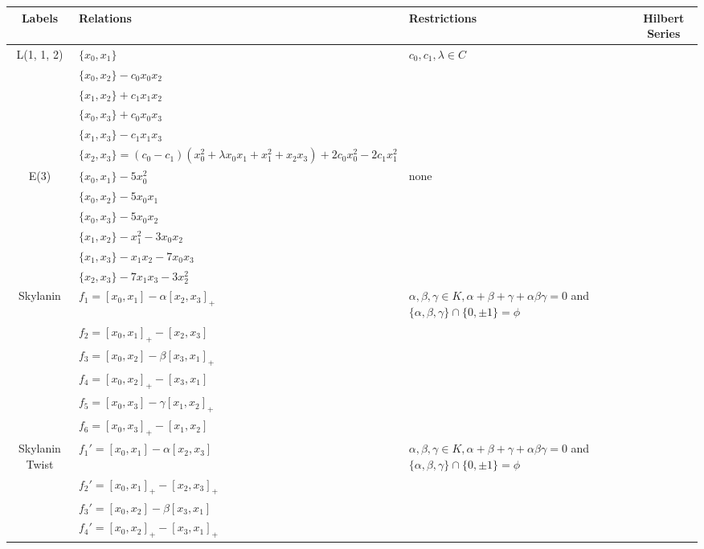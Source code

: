 \documentclass[12]{article}
\begin{document}
\begin{longtable}[c]{|c|p{5.75cm}|p{2.8cm}|c|}
\toprule
 Labels & Relations & Restrictions & Hilbert Series \\ 
\endfirsthead 
  \hline
L(1, 1, 2)& $ \{x_0, x_1\} $ &\multirow{6}{*}{$ c_0,c_1,\lambda \in C $} & \\ 
 & $ \{x_0, x_2\} - c_0x_0x_2 $ & &  \\ 
   & $ \{x_1, x_2\} + c_1x_1x_2 $ & & \\  
   & $ \{x_0, x_3\} +  c_0x_0x_3 $ & & \\  
   & $ \{x_1 , x_3\} - c_1x_1x_3 $ & & \\ 
   & $ \{x_2, x_3\} = (c_0 - c_1)( x^2_0 + \lambda x_0x_1 + x^2_1 + x_2x_3 ) + 2 c_0x^2_0 - 2 c_1x^2_1 $ & &  \\  
\hline
E(3) & $ \{x_0, x_1\} - 5x^2_0 $  &\multirow{6}{*}{none} & \\ 
 &  $ \{x_0, x_2\} - 5x_0x_1 $ & &  \\ 
   & $ \{x_0, x_3\} -5 x_0x_2 $ & & \\  
   & $ \{x_1, x_2\} -  x^2_1 - 3 x_0x_2 $ & & \\  
   & $ \{x_1 , x_3\} - x_1x_2 - 7x_0x_3 $ & & \\ 
   & $ \{x_2 ,   x_3\} - 7x_1x_3 - 3x^2_2  $ & &  \\  
\hline
 Skylanin& $ f_1 = [ x_0, x_1]  -  \alpha[x_2, x_3]_+$ &$ \alpha, \beta, \gamma \in K,\alpha + \beta + \gamma +\alpha \beta \gamma = 0 $ and $ \{ \alpha, \beta, \gamma \} \cap \{0, \pm1\} = \phi $& \\ 
& $ f_2  = [x_0, x_1]_+  -  [x_2, x_3] $ & &  \\ 
   & $ f_3  = [x_0, x_2] - \beta [x_3, x_1]_+ $ & & \\  
   &  $ f_4 = [x_0, x_2]_+ - [x_3, x_1] $ & & \\  
   & $ f_5 = [x_0, x_3] - \gamma [x_1, x_2]_+ $ & & \\ 
   & $ f_6 = [x_0, x_3]_+ - [x_1, x_2] $ & &  \\  
\hline
Skylanin Twist & $ f_1' = [x_0, x_1]  -  \alpha[x_2, x_3] $ &$ \alpha, \beta, \gamma \in K, \alpha + \beta + \gamma +\alpha \beta \gamma = 0 $ and $ \{ \alpha, \beta, \gamma \} \cap \{0, \pm1\} = \phi $ & \\ 
 & $ f_2 ' = [x_0, x_1]_+  -  [x_2, x_3]_+ $ & &  \\ 
   &$ f_3 ' = [x_0, x_2] - \beta [x_3, x_1] $ & & \\  
   & $ f_4' = [x_0, x_2]_+ - [x_3, x_1]_+ $ & & \\  

\end{longtable}
\end{document}
